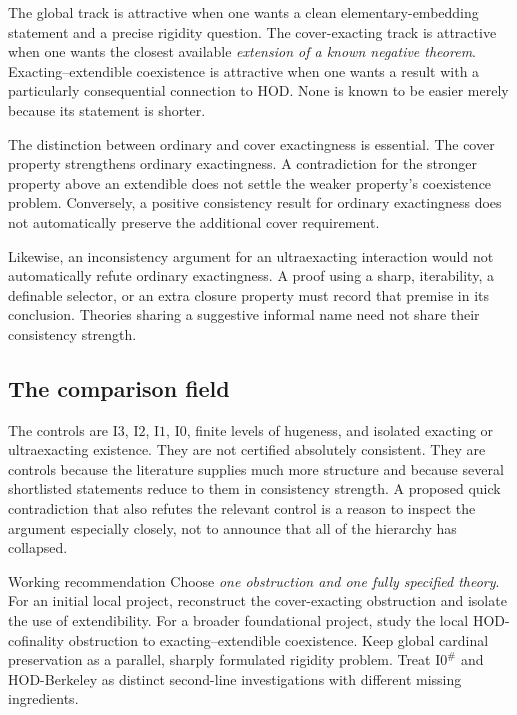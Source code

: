 \documentclass[11pt,letterpaper]{article}
\theoremstyle{definition}
\newcommand{\Izero}{\mathrm{I0}}
\newcommand{\Ione}{\mathrm{I1}}
\newcommand{\Itwo}{\mathrm{I2}}
\newcommand{\Ithree}{\mathrm{I3}}
\newcommand{\Isharp}{\mathrm{I0}^{\#}}
\begin{document}
The global track is attractive when one wants a clean elementary-embedding statement and a precise rigidity question. The cover-exacting track is attractive when one wants the closest available \emph{extension of a known negative theorem}. Exacting--extendible coexistence is attractive when one wants a result with a particularly consequential connection to HOD. None is known to be easier merely because its statement is shorter.

The distinction between ordinary and cover exactingness is essential. The cover property strengthens ordinary exactingness. A contradiction for the stronger property above an extendible does not settle the weaker property's coexistence problem. Conversely, a positive consistency result for ordinary exactingness does not automatically preserve the additional cover requirement.

Likewise, an inconsistency argument for an ultraexacting interaction would not automatically refute ordinary exactingness. A proof using a sharp, iterability, a definable selector, or an extra closure property must record that premise in its conclusion. Theories sharing a suggestive informal name need not share their consistency strength.

\subsection{The comparison field}

The controls are $\Ithree$, $\Itwo$, $\Ione$, $\Izero$, finite levels of hugeness, and isolated exacting or ultraexacting existence. They are not certified absolutely consistent. They are controls because the literature supplies much more structure and because several shortlisted statements reduce to them in consistency strength. A proposed quick contradiction that also refutes the relevant control is a reason to inspect the argument especially closely, not to announce that all of the hierarchy has collapsed. \cite{dimonte,iterability,abgl}

\begin{assessment}{Working recommendation}
Choose \emph{one obstruction and one fully specified theory}. For an initial local project, reconstruct the cover-exacting obstruction and isolate the use of extendibility. For a broader foundational project, study the local HOD-cofinality obstruction to exacting--extendible coexistence. Keep global cardinal preservation as a parallel, sharply formulated rigidity problem. Treat $\Isharp$ and HOD-Berkeley as distinct second-line investigations with different missing ingredients.
\end{assessment}
\end{document}
